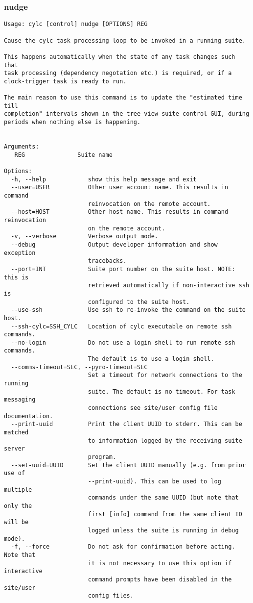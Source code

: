 \subsubsection{nudge}
\label{nudge}
\begin{lstlisting}
Usage: cylc [control] nudge [OPTIONS] REG 

Cause the cylc task processing loop to be invoked in a running suite.

This happens automatically when the state of any task changes such that
task processing (dependency negotation etc.) is required, or if a
clock-trigger task is ready to run.

The main reason to use this command is to update the "estimated time till
completion" intervals shown in the tree-view suite control GUI, during
periods when nothing else is happening.


Arguments:
   REG               Suite name

Options:
  -h, --help            show this help message and exit
  --user=USER           Other user account name. This results in command
                        reinvocation on the remote account.
  --host=HOST           Other host name. This results in command reinvocation
                        on the remote account.
  -v, --verbose         Verbose output mode.
  --debug               Output developer information and show exception
                        tracebacks.
  --port=INT            Suite port number on the suite host. NOTE: this is
                        retrieved automatically if non-interactive ssh is
                        configured to the suite host.
  --use-ssh             Use ssh to re-invoke the command on the suite host.
  --ssh-cylc=SSH_CYLC   Location of cylc executable on remote ssh commands.
  --no-login            Do not use a login shell to run remote ssh commands.
                        The default is to use a login shell.
  --comms-timeout=SEC, --pyro-timeout=SEC
                        Set a timeout for network connections to the running
                        suite. The default is no timeout. For task messaging
                        connections see site/user config file documentation.
  --print-uuid          Print the client UUID to stderr. This can be matched
                        to information logged by the receiving suite server
                        program.
  --set-uuid=UUID       Set the client UUID manually (e.g. from prior use of
                        --print-uuid). This can be used to log multiple
                        commands under the same UUID (but note that only the
                        first [info] command from the same client ID will be
                        logged unless the suite is running in debug mode).
  -f, --force           Do not ask for confirmation before acting. Note that
                        it is not necessary to use this option if interactive
                        command prompts have been disabled in the site/user
                        config files.
\end{lstlisting}
